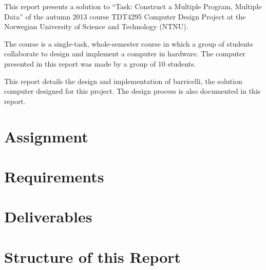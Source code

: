 This report presents a solution to ``Task: Construct a Multiple Program, Multiple Data'' of the autumn 2013 course TDT4295 Computer Design Project at the Norwegian University of Science and Technology (NTNU).

The course is a single-task, whole-semester course in which a group of students collaborate to design and implement a computer in hardware.
The computer presented in this report was made by a group of 10 students.

This report details the design and implementation of \Gls{barricelli}, the solution computer designed for this project.
The design process is also documented in this report.

\section{Assignment}



\section{Requirements}



\section{Deliverables}



\section{Structure of this Report}



